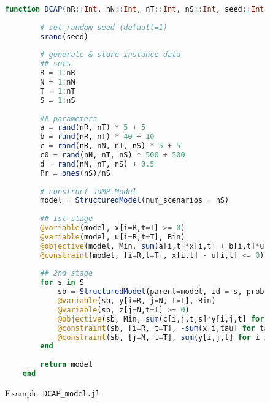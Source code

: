 \begin{figure}[]
	\centering
	\begin{lstlisting}[frame=single,language=julia]
	function DCAP(nR::Int, nN::Int, nT::Int, nS::Int, seed::Int=1)::JuMP.Model
		
		# set random seed (default=1)
		srand(seed)
		
		# generate & store instance data
		## sets
		R = 1:nR
		N = 1:nN
		T = 1:nT
		S = 1:nS
		
		## parameters
		a = rand(nR, nT) * 5 + 5
		b = rand(nR, nT) * 40 + 10
		c = rand(nR, nN, nT, nS) * 5 + 5
		c0 = rand(nN, nT, nS) * 500 + 500
		d = rand(nN, nT, nS) + 0.5
		Pr = ones(nS)/nS
		
		# construct JuMP.Model
		model = StructuredModel(num_scenarios = nS)
		
		## 1st stage
		@variable(model, x[i=R,t=T] >= 0)
		@variable(model, u[i=R,t=T], Bin)
		@objective(model, Min, sum(a[i,t]*x[i,t] + b[i,t]*u[i,t] for i in R for t in T))
		@constraint(model, [i=R,t=T], x[i,t] - u[i,t] <= 0)
		
		## 2nd stage
		for s in S
			sb = StructuredModel(parent=model, id = s, prob = Pr[s])
			@variable(sb, y[i=R, j=N, t=T], Bin)
			@variable(sb, z[j=N,t=T] >= 0)
			@objective(sb, Min, sum(c[i,j,t,s]*y[i,j,t] for i in R for j in N for t in T) + sum(c0[j,t,s]*z[j,t] for j in N for t in T))
			@constraint(sb, [i=R, t=T], -sum(x[i,tau] for tau in 1:t) + sum(d[j,t,s]*y[i,j,t] for j in N) <= 0)
			@constraint(sb, [j=N, t=T], sum(y[i,j,t] for i in R) + z[j,t] == 1)
		end
		
		return model
	end

	\end{lstlisting}
	\caption{Example: \texttt{DCAP\_model.jl}}\label{fig:DCAP_model.jl}
\end{figure}

